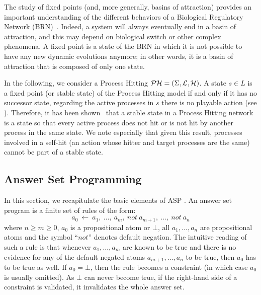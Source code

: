 The study of fixed points (and, more generally, basins of attraction) provides an important understanding of the different behaviors of a Biological Regulatory Network (BRN)~\cite{wuensche1998genomic}.
Indeed, a system will always eventually end in a basin of attraction,
and this may depend on biological switch or other complex phenomena.
A fixed point is a state of the BRN in which it is not possible to have any new dynamic evolutions anymore;
in other words, it is a basin of attraction that is composed of only one state.

In the following, we consider a Process Hitting $\mathcal{PH} = (\Sigma, \mathcal{L}, \mathcal{H})$.
A state $s \in L$ is a fixed point (or stable state) of the Process Hitting model if and only if it has no successor state, \ie regarding the active processes in $s$ there is no playable action (see ).
Therefore, it has been shown~\cite{PMR10-TCSB} that
a stable state in a Process Hitting network is a state so that
every active process does not hit or is not hit by another process in the same state.
We note especially that given this result, processes involved in a self-hit (an action whose hitter and target processes are the same) cannot be part of a stable state.

\subsection{Answer Set Programming}

In this section, we recapitulate the basic elements of ASP \cite{baral2003knowledge, Vladimir, Glimpse}.
An answer set program is a finite set of rules of the form:
  \[a_{0}\ \leftarrow \ a_{1},\ \ldots,\ a_{m},\ not\ a_{m+1},\ \ldots,\ not\ a_{n}\]
where $n \ge m \ge 0$, $a_{0}$ is a propositional atom or $\bot$, all
$a_{1}, \ldots ,a_{n}$ are propositional atoms and the symbol ``$not$'' denotes default negation.
The intuitive reading of such a rule is that whenever $a_{1}, \ldots, a_{m}$
are known to be true and there is no evidence for any of the default negated atoms $a_{m+1}, \ldots, a_{n}$ to be true, then $a_{0}$ has to be true as well.
If $a_{0} = \bot$, then the rule becomes a constraint (in which case $a_{0}$ is usually omitted).
As $\bot$ can never become true, if the right-hand side of a constraint is validated, it invalidates the whole answer set.

